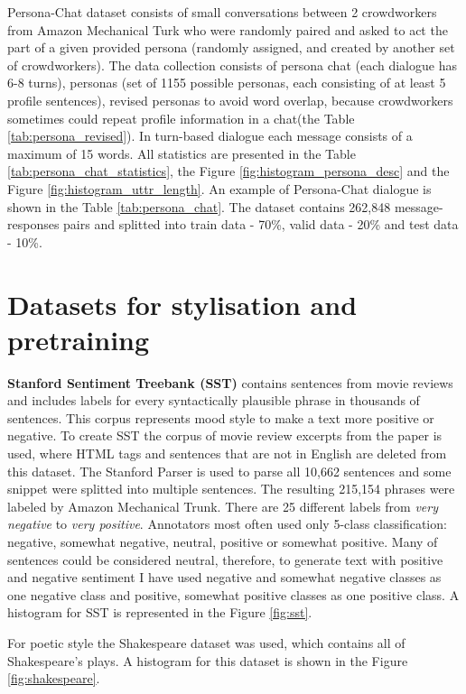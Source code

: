 Persona-Chat dataset consists of small conversations between 2 crowdworkers from Amazon Mechanical Turk who were randomly paired and asked to act the part of a given provided persona (randomly assigned, and created by another set of crowdworkers). The data collection consists of persona chat (each dialogue has 6-8 turns), personas (set of 1155 possible personas, each consisting of at least 5 profile sentences), revised personas to avoid word overlap, because crowdworkers sometimes could repeat profile information in a chat(the Table \ref{tab:persona_revised}). In turn-based dialogue each message consists of a maximum of 15 words. All statistics are presented in the Table \ref{tab:persona_chat_statistics}, the Figure \ref{fig:histogram_persona_desc} and the Figure \ref{fig:histogram_uttr_length}. An example of Persona-Chat dialogue is shown in the Table \ref{tab:persona_chat}. The dataset contains 262,848 message-responses pairs and splitted into train data - 70\%, valid data - 20\% and test data - 10\%.

\section{Datasets for stylisation and pretraining} \label{stylistic_dataset_section}
\textbf{Stanford Sentiment Treebank (SST)} contains sentences from movie reviews and includes labels for every syntactically plausible phrase in thousands of sentences. This corpus represents mood style to make a text more positive or negative. To create SST the corpus of movie review excerpts from the paper \cite{pang2005seeing} is used, where HTML tags and sentences that are not in English are deleted from this dataset. The Stanford Parser is used to parse all 10,662 sentences and some snippet were splitted into multiple sentences. The resulting 215,154 phrases were labeled by Amazon Mechanical Trunk. There are 25 different labels from \textit{very negative} to \textit{very positive}. Annotators most often used only 5-class classification: negative, somewhat negative, neutral, positive or somewhat positive. Many of sentences could be considered neutral, therefore, to generate text with positive and negative sentiment I have used negative and somewhat negative classes as one negative class and positive, somewhat positive classes as one positive class. A histogram for SST is represented in the Figure \ref{fig:sst}.

For poetic style the Shakespeare dataset was used, which contains all of Shakespeare's plays. A histogram for this dataset is shown in the Figure \ref{fig:shakespeare}.

